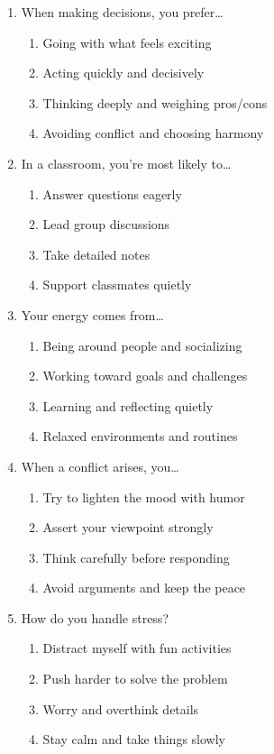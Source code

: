 \documentclass[12pt]{article}
\begin{document}
\begin{enumerate}[label=\textbf{Q\arabic*.}]
\item When making decisions, you prefer…
\begin{enumerate}[label=(\Alph*)]
\item Going with what feels exciting
\item Acting quickly and decisively
\item Thinking deeply and weighing pros/cons
\item Avoiding conflict and choosing harmony
\end{enumerate}

\item In a classroom, you’re most likely to…
\begin{enumerate}[label=(\Alph*)]
\item Answer questions eagerly
\item Lead group discussions
\item Take detailed notes
\item Support classmates quietly
\end{enumerate}

\item Your energy comes from…
\begin{enumerate}[label=(\Alph*)]
\item Being around people and socializing
\item Working toward goals and challenges
\item Learning and reflecting quietly
\item Relaxed environments and routines
\end{enumerate}

\item When a conflict arises, you…
\begin{enumerate}[label=(\Alph*)]
\item Try to lighten the mood with humor
\item Assert your viewpoint strongly
\item Think carefully before responding
\item Avoid arguments and keep the peace
\end{enumerate}

\item How do you handle stress?
\begin{enumerate}[label=(\Alph*)]
\item Distract myself with fun activities
\item Push harder to solve the problem
\item Worry and overthink details
\item Stay calm and take things slowly
\end{enumerate}


\end{enumerate}
\end{document}
